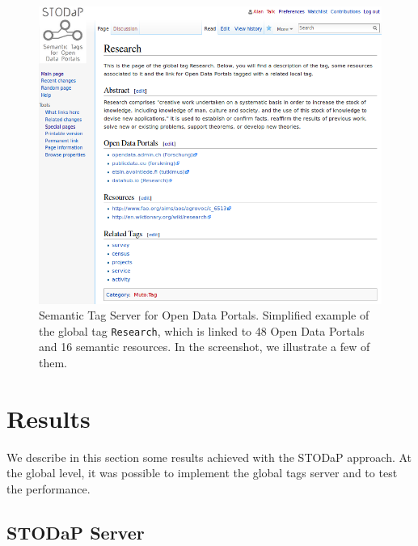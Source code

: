 \begin{figure}[ht]
\begin{center}
\includegraphics[width=\columnwidth]{images/tag_server.png}
\caption[Semantic Tag Server for Open Data Portals.]{Semantic Tag Server for Open Data Portals. Simplified example of the global tag \texttt{Research}, which is linked to 48 Open Data Portals and 16 semantic resources. In the screenshot, we illustrate a few of them.}
\label{fig:tag_server}
\end{center}
\end{figure}

\section{Results}
\label{sec:results}

We describe in this section some results achieved with the STODaP approach.
At the global level, it was possible to implement the global tags server and to test the performance.

\subsection{STODaP Server}

